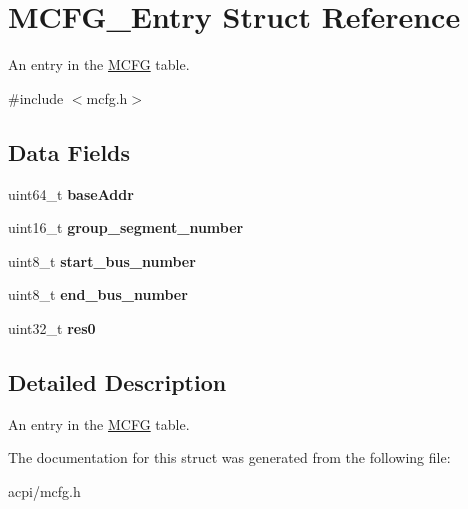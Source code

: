 \hypertarget{structMCFG__Entry}{}\section{M\+C\+F\+G\+\_\+\+Entry Struct Reference}
\label{structMCFG__Entry}


An entry in the \hyperlink{structMCFG}{M\+C\+FG} table.  




{\ttfamily \#include $<$mcfg.\+h$>$}

\subsection*{Data Fields}
\begin{DoxyCompactItemize}
\item 
uint64\+\_\+t {\bfseries base\+Addr}\hypertarget{structMCFG__Entry_a829db430b1bbcddf2d2ff112416b8a4b}{}\label{structMCFG__Entry_a829db430b1bbcddf2d2ff112416b8a4b}

\item 
uint16\+\_\+t {\bfseries group\+\_\+segment\+\_\+number}\hypertarget{structMCFG__Entry_a5c225ade574c7a32360b6e8f1d14bcb4}{}\label{structMCFG__Entry_a5c225ade574c7a32360b6e8f1d14bcb4}

\item 
uint8\+\_\+t {\bfseries start\+\_\+bus\+\_\+number}\hypertarget{structMCFG__Entry_a4ba23e81a744034ea1f807d309999fe6}{}\label{structMCFG__Entry_a4ba23e81a744034ea1f807d309999fe6}

\item 
uint8\+\_\+t {\bfseries end\+\_\+bus\+\_\+number}\hypertarget{structMCFG__Entry_a38c004d6e982f0c86495c96a5e840959}{}\label{structMCFG__Entry_a38c004d6e982f0c86495c96a5e840959}

\item 
uint32\+\_\+t {\bfseries res0}\hypertarget{structMCFG__Entry_ae7d4ba34b8c64ca27a9023d9ebfe1859}{}\label{structMCFG__Entry_ae7d4ba34b8c64ca27a9023d9ebfe1859}

\end{DoxyCompactItemize}


\subsection{Detailed Description}
An entry in the \hyperlink{structMCFG}{M\+C\+FG} table. 

The documentation for this struct was generated from the following file\+:\begin{DoxyCompactItemize}
\item 
acpi/mcfg.\+h\end{DoxyCompactItemize}
